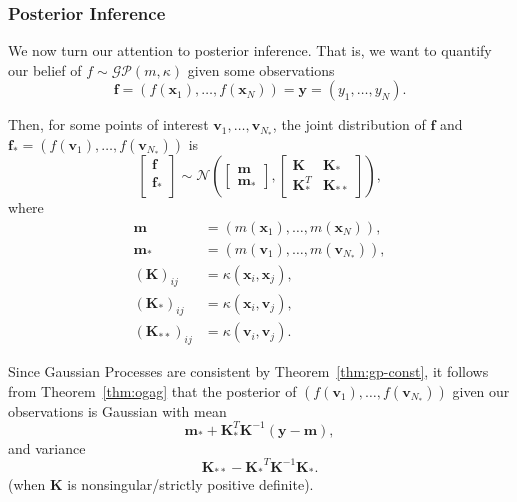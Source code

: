\subsubsection{Posterior Inference}

We now turn our attention to posterior inference.
That is, we want to quantify our belief of $f \sim \mathcal{GP}(m, \kappa)$ given some observations
\begin{equation*}
    \mathbf{f} = (f(\mathbf{x}_1), \dots, f(\mathbf{x}_N)) = \mathbf{y} = (y_1, \dots, y_N).
\end{equation*}

Then, for some points of interest $\mathbf{v}_{1}, \dots, \mathbf{v}_{N_{*}}$, the joint distribution of $\mathbf{f}$ and $\mathbf{f}_* = (f(\mathbf{v}_1), \dots, f(\mathbf{v}_{N_*}))$ is
\begin{equation*}
    \begin{bmatrix}
        \mathbf{f} \\
        \mathbf{f}_{*} \\
    \end{bmatrix}
    \sim
    \mathcal{N}\left(
    \begin{bmatrix}
            \mathbf{m} \\
            \mathbf{m}_{*}
        \end{bmatrix}
    ,
    \begin{bmatrix}
            \mathbf{K} & \mathbf{K}_* \\
            \mathbf{K}_*^T & \mathbf{K}_{* *}
        \end{bmatrix}
    \right),
\end{equation*}
where
\begin{align*}
    \mathbf{m} & = (m(\mathbf{x}_1), \dots, m(\mathbf{x}_N)), \\
    \mathbf{m_*} & = (m(\mathbf{v}_1), \dots, m(\mathbf{v}_{N_{*}})), \\
    (\mathbf{K})_{ij} & = \kappa(\mathbf{x}_i, \mathbf{x}_j), \\
    (\mathbf{K}_*)_{ij} & = \kappa(\mathbf{x}_i, \mathbf{v}_j), \\
    (\mathbf{K}_{* *})_{ij} & = \kappa(\mathbf{v}_i, \mathbf{v}_j).
\end{align*}

Since Gaussian Processes are consistent by Theorem~\ref{thm:gp-const}, it follows from Theorem~\ref{thm:ogag} that the posterior
of $(f(\mathbf{v}_1), \dots, f(\mathbf{v}_{N_*}))$ given our observations is Gaussian with mean
\begin{equation}
    \label{eq:noisless-post-mean}
    \mathbf{m}_* + \mathbf{K}_*^T \mathbf{K}^{-1} (\mathbf{y} - \mathbf{m}),
\end{equation}
and variance
\begin{equation}
    \label{eq:noiseless-post-var}
    \mathbf{K}_{* *} - \mathbf{K_*}^{T} \mathbf{K}^{-1} \mathbf{K_*}.
\end{equation}
(when $\mathbf{K}$ is nonsingular/strictly positive definite).

